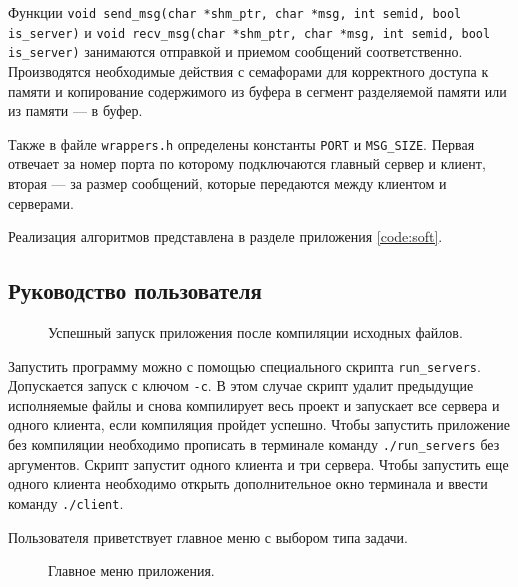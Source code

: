 \documentclass[a4paper,14pt]{extarticle}
\begin{document}
Функции \verb|void send_msg(char *shm_ptr, char *msg, int semid, bool is_server)| и \verb|void recv_msg(char *shm_ptr, char *msg, int semid, bool is_server)| занимаются отправкой и приемом сообщений соответственно. Производятся необходимые действия с семафорами для корректного доступа к памяти и копирование содержимого из буфера в сегмент разделяемой памяти или из памяти --- в буфер.

Также в файле \verb|wrappers.h| определены константы \verb|PORT| и \verb|MSG_SIZE|. Первая отвечает за номер порта по которому подключаются главный сервер и клиент, вторая --- за размер сообщений, которые передаются между клиентом и серверами.

Реализация алгоритмов представлена в разделе приложения \ref{code:soft}.

\subsection{Руководство пользователя}

\begin{figure}[h]
\caption{Успешный запуск приложения после компиляции исходных файлов.}
\label{1.png}
\end{figure}

Запустить программу можно с помощью специального скрипта \verb|run_servers|. Допускается запуск с ключом \verb|-c|. В этом случае скрипт удалит предыдущие исполняемые файлы и снова компилирует весь проект и запускает все сервера и одного клиента, если компиляция пройдет успешно. Чтобы запустить приложение без компиляции необходимо прописать в терминале команду \verb|./run_servers| без аргументов. Скрипт запустит одного клиента и три сервера. Чтобы запустить еще одного клиента необходимо открыть дополнительное окно терминала и ввести команду \verb|./client|.

Пользователя приветствует главное меню с выбором типа задачи.

\begin{figure}[h]
\caption{Главное меню приложения.}
\label{1.png}
\end{figure}
\end{document}

